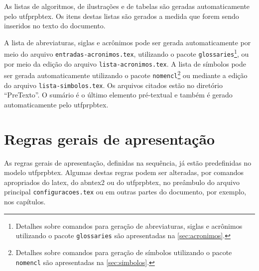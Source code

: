 As listas de algoritmos, de ilustrações e de tabelas são geradas automaticamente pelo \gls{utfprpbtex}. Os itens destas listas são gerados a medida que forem sendo inseridos no texto do documento. 

A lista de abreviaturas, siglas e acrônimos pode ser gerada automaticamente por meio do arquivo \texttt{entradas-acronimos.tex}, utilizando o pacote \texttt{glossaries}\footnote{Detalhes sobre comandos para geração de abreviaturas, siglas e acrônimos utilizando o pacote \texttt{glossaries} são apresentadas na \autoref{sec:acronimos}.}, ou por meio da edição do arquivo \texttt{lista-acronimos.tex}. A lista de símbolos pode ser gerada automaticamente utilizando o pacote \texttt{nomencl}\footnote{Detalhes sobre comandos para geração de símbolos utilizando o pacote \texttt{nomencl} são apresentadas na \autoref{sec:simbolos}.} ou mediante a edição do arquivo \texttt{lista-simbolos.tex}. Os arquivos citados estão no diretório ``PreTexto''. O sumário é o último elemento pré-textual e também é gerado automaticamente pelo \gls{utfprpbtex}.

\section{Regras gerais de apresentação}\label{sec:regrasgerais}

As regras gerais de apresentação, definidas na sequência, já estão predefinidas no modelo \gls{utfprpbtex}. Algumas destas regras podem ser alteradas, por comandos apropriados do \gls{latex}, do \gls{abntex2} ou do \gls{utfprpbtex}, no preâmbulo do arquivo principal \texttt{configuracoes.tex} ou em outras partes do documento, por exemplo, nos capítulos.

